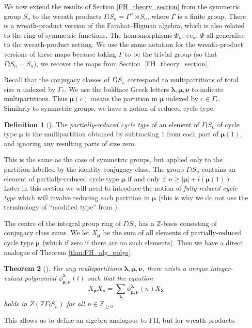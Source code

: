 \documentclass[10pt]{article}
\newtheorem{theorem}{Theorem}[section]
\theoremstyle{definition}
\newtheorem{definition}[theorem]{Definition}
\newcommand{\bs}{\boldsymbol}
\newcommand{\FH}{\mathrm{FH}}
\begin{document}
We now extend the results of Section \ref{FH_theory_section} from the symmetric group $S_n$ to the wreath products $\Gamma \wr S_n = \Gamma ^n \rtimes S_n$, where $\Gamma$ is a finite group. There is a wreath-product version of the Farahat--Higman algebra, which is also related to the ring of symmetric functions. The homomorphisms $\Phi_n$, $ev_n$, $\Psi$ all generalise to the wreath-product setting. We use the same notation for the wreath-product versions of these maps because taking $\Gamma$ to be the trivial group (so that $\Gamma \wr S_n = S_n$), we recover the maps from Section~\ref{FH_theory_section}.

Recall that the conjugacy classes of $\Gamma \wr S_n$ correspond to multipartitions of total size $n$ indexed by $\Gamma_*$. We use the boldface Greek letters $\bs \lambda, \bs \mu, \bs \nu$ to indicate multipartitions. Thus $\bs{\mu}(c)$ means the partition in $\bs \mu$ indexed by $c \in \Gamma_*$. Similarly to symmetric groups, we have a notion of reduced cycle type. 
\begin{definition}[{\cite[Subsection 2.3]{Wang1}}]
The \emph{partially-reduced cycle type} of an element of $\Gamma \wr S_n$ of cycle type $\bs{\mu}$ is the multipartition obtained by subtracting $1$ from each part of $\bs \mu(1)$, and ignoring any resulting parts of size zero. 
\end{definition}

This is the same as the case of symmetric groups, but applied only to the partition labelled by the identity conjugacy class. The group $\Gamma \wr S_n$ contains an element of partially-reduced cycle type $\bs \mu$ if and only if $n \geq |\bs \mu| + l(\bs \mu(1))$. Later in this section we will need to introduce the notion of \emph{fully-reduced cycle type} which will involve reducing each partition in $\bs \mu$ (this is why we do not use the terminology of ``modified type'' from \cite{Wang1}).

The centre of the integral group ring of $\Gamma \wr S_n$ has a $\mathbb{Z}$-basis consisting of conjugacy class sums. We let $X_{\bs \mu}$ be the sum of all elements of partially-reduced cycle type $\bs \mu$ (which if zero if there are no such elements). Then we have a direct analogue of Theorem \ref{thm:FH_alg_polys}.

\begin{theorem}[{\cite[Theorem 2.13]{Wang1}}] \label{FH_g_alg_polys_thm}
For any multipartitions $\bs \lambda, \bs\mu, \bs\nu$, there exists a unique integer-valued polynomial $\phi_{\bs\mu, \bs\nu}^{\bs\lambda}(t)$ such that the equation
\[
X_{\bs\mu} X_{\bs\nu} = \sum_{\bs\lambda} \phi_{\bs\mu, \bs\nu}^{\bs\lambda}(n)X_{\bs\lambda}
\]
holds in $Z(\mathbb{Z} \Gamma \wr S_n)$ for all $n \in \mathbb{Z}_{\geq 0}$.
\end{theorem}
This allows us to define an algebra analogous to $\FH$, but for wreath products.
\end{document}
